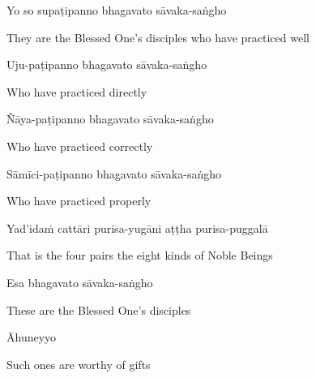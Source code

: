 Yo so supaṭipanno bhagavato sāvaka-saṅgho

\begin{english}
  They are the Blessed One's disciples who have practiced well
\end{english}

Uju-paṭipanno bhagavato sāvaka-saṅgho

\begin{english}
  Who have practiced directly\makeatletter\hyperlink{endnote5-appendix}\makeatother

\end{english}

Ñāya-paṭipanno bhagavato sāvaka-saṅgho

\begin{english}
  Who have practiced correctly\makeatletter\hyperlink{endnote6-appendix}\makeatother

\end{english}

Sāmīci-paṭipanno bhagavato sāvaka-saṅgho

\begin{english}
  Who have practiced properly\makeatletter\hyperlink{endnote7-appendix}\makeatother

\end{english}

Yad'idaṁ cattāri purisa-yugāni aṭṭha purisa-puggalā

\begin{english}
  That is the four pairs the eight kinds of Noble Beings
\end{english}

Esa bhagavato sāvaka-saṅgho

\begin{english}
  These are the Blessed One's disciples
\end{english}

Āhuneyyo

\begin{english}
  Such ones are worthy of gifts
\end{english}

